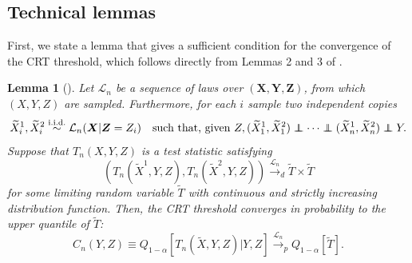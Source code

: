 \documentclass[12pt]{article}
\newtheorem{lemma}{Lemma}
\theoremstyle{definition}
\theoremstyle{remark}
\def\independenT#1#2{\mathrel{\rlap{$#1#2$}\mkern2mu{#1#2}}}
\newcommand\independent{\protect\mathpalette{\protect\independenT}{\perp}}
\newcommand{\prx}{\bm X}
\newcommand{\srx}{X}
\newcommand{\prz}{\bm Z}
\newcommand{\srz}{Z}
\newcommand{\srxk}{\widetilde X}
\newcommand{\pry}{{\bm Y}}
\newcommand{\sry}{Y}
\begin{document}
\subsection{Technical lemmas}

First, we state a lemma that gives a sufficient condition for the convergence of the CRT threshold, which follows directly from  Lemmas 2 and 3 of \cite{Wang2020b}.
\begin{lemma}[\cite{Wang2020b}] \label{lem:lucas}
	Let $\mathcal L_n$ be a sequence of laws over $(\prx,\pry,\prz)$, from which $(\srx,\sry,\srz)$ are sampled. Furthermore, for each $i$ sample two independent copies
	\begin{equation}
		\srxk_i^1,\srxk_i^2 \overset{\text{i.i.d.}}\sim \mathcal L_n(\prx|\prz = \srz_i) \quad \text{such that, given } \srz,  (\srxk_1^1,\srxk_1^2) \independent \cdots \independent (\srxk_n^1,\srxk_n^2) \independent \sry.
		\label{eq:two-resamples}
	\end{equation}
	Suppose that $T_n(\srx,\sry,\srz)$ is a test statistic satisfying 
	\begin{equation}
		(T_n(\srxk^1,\sry,\srz), T_n(\srxk^2, \sry,\srz)) \overset{\mathcal L_n}\rightarrow_d  \widetilde T \times \widetilde T
	\end{equation}
	for some limiting random variable $\widetilde T$ with continuous and strictly increasing distribution function. Then, the CRT threshold converges in probability to the upper quantile of $\widetilde T$:
	\begin{equation}
		C_n(\sry, \srz) \equiv Q_{1-\alpha}[T_n(\srxk,\sry,\srz)|\sry,\srz]  \overset{\mathcal L_n}\rightarrow_p Q_{1-\alpha}[\widetilde T].
	\end{equation}
	
\end{lemma}
\end{document}
